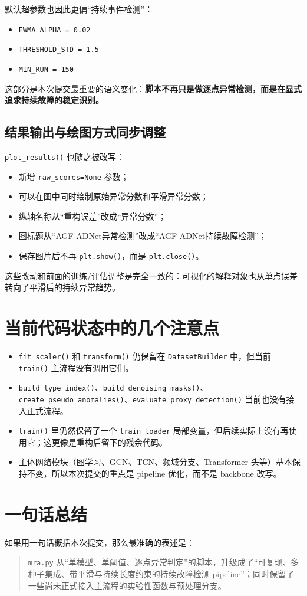 \documentclass[UTF8]{ctexart}
\begin{document}
默认超参数也因此更偏“持续事件检测”：
\begin{itemize}
    \item \texttt{EWMA\_ALPHA = 0.02}
    \item \texttt{THRESHOLD\_STD = 1.5}
    \item \texttt{MIN\_RUN = 150}
\end{itemize}

这部分是本次提交最重要的语义变化：\textbf{脚本不再只是做逐点异常检测，而是在显式追求持续故障的稳定识别。}

\subsection{结果输出与绘图方式同步调整}

\texttt{plot\_results()} 也随之被改写：
\begin{itemize}
    \item 新增 \texttt{raw\_scores=None} 参数；
    \item 可以在图中同时绘制原始异常分数和平滑异常分数；
    \item 纵轴名称从“重构误差”改成“异常分数”；
    \item 图标题从“AGF-ADNet异常检测”改成“AGF-ADNet持续故障检测”；
    \item 保存图片后不再 \texttt{plt.show()}，而是 \texttt{plt.close()}。
\end{itemize}

这些改动和前面的训练/评估调整是完全一致的：可视化的解释对象也从单点误差转向了平滑后的持续异常趋势。

\section{当前代码状态中的几个注意点}

\begin{itemize}
    \item \texttt{fit\_scaler()} 和 \texttt{transform()} 仍保留在 \texttt{DatasetBuilder} 中，但当前 \texttt{train()} 主流程没有调用它们。
    \item \texttt{build\_type\_index()}、\texttt{build\_denoising\_masks()}、\texttt{create\_pseudo\_anomalies()}、\texttt{evaluate\_proxy\_detection()} 当前也没有接入正式流程。
    \item \texttt{train()} 里仍然保留了一个 \texttt{train\_loader} 局部变量，但后续实际上没有再使用它；这更像是重构后留下的残余代码。
    \item 主体网络模块（图学习、GCN、TCN、频域分支、Transformer 头等）基本保持不变，所以本次提交的重点是 pipeline 优化，而不是 backbone 改写。
\end{itemize}

\section{一句话总结}

如果用一句话概括本次提交，那么最准确的表述是：
\begin{quote}
\texttt{mra.py} 从“单模型、单阈值、逐点异常判定”的脚本，升级成了“可复现、多种子集成、带平滑与持续长度约束的持续故障检测 pipeline”；同时保留了一些尚未正式接入主流程的实验性函数与预处理分支。
\end{quote}
\end{document}
